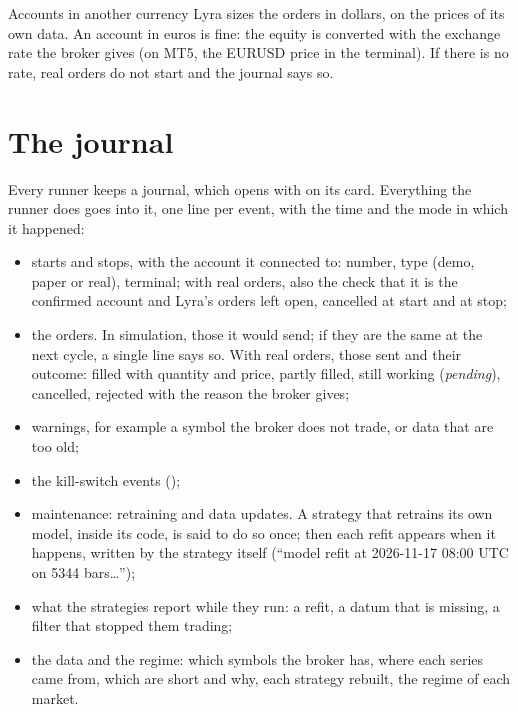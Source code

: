 \begin{nota}{Accounts in another currency}
Lyra sizes the orders in dollars, on the prices of its own data. An account
in euros is fine: the equity is converted with the exchange rate the broker
gives (on MT5, the EURUSD price in the terminal). If there is no rate, real
orders do not start and the journal says so.
\end{nota}

\section{The journal}\label{sez:journal}

Every runner keeps a journal, which opens with  on its card.
Everything the runner does goes into it, one line per event, with the time
and the mode in which it happened:

\begin{itemize}
  \item starts and stops, with the account it connected to: number, type
        (demo, paper or real), terminal; with real orders, also the check
        that it is the confirmed account and Lyra's orders left open,
        cancelled at start and at stop;
  \item the orders. In simulation, those it would send; if they are the same
        at the next cycle, a single line says so. With real orders, those
        sent and their outcome: filled with quantity and price, partly
        filled, still working (\emph{pending}), cancelled, rejected with the
        reason the broker gives;
  \item warnings, for example a symbol the broker does not trade, or data
        that are too old;
  \item the kill-switch events ();
  \item maintenance: retraining and data updates. A strategy that retrains
        its own model, inside its code, is said to do so once; then each
        refit appears when it happens, written by the strategy itself
        (\enquote{model refit at 2026-11-17 08:00 UTC on 5344 bars\ldots});
  \item what the strategies report while they run: a refit, a datum that is
        missing, a filter that stopped them trading;
  \item the data and the regime: which symbols the broker has, where each
        series came from, which are short and why, each strategy rebuilt,
        the regime of each market.
\end{itemize}

